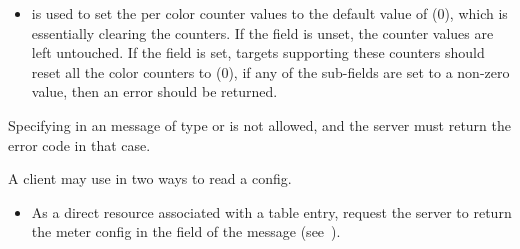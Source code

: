 \documentclass[11pt]{article}
\begin{document}
{\begin{itemize}
\item{}
 is used to set the per color counter values to the default
value of (0), which is essentially clearing the counters. If the field is
unset, the counter values are left untouched. If the field is set, targets
supporting these counters should reset all the color counters to (0), if any
of the sub-fields are set to a non-zero value, then an 
error should be returned.%
\end{itemize}%

\noindent{}Specifying  in an  message of type  or
 is not allowed, and the server must return the error code
 in that case.%

A client may use  in two ways to read a  config.%

\begin{itemize}%

\item{}
As a direct resource associated with a table entry, request the server to
return the meter config in the  field of the 
message (see~).%


\end{itemize}}
\end{document}
